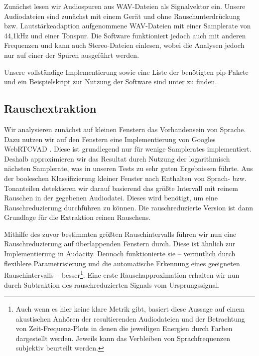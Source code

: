 \documentclass[
	fontsize=10.5pt,
	marginpar=false,
	ngerman,
	accentcolor=3d
	]{tudapub}
\begin{document}
Zunächst lesen wir Audiospuren aus WAV-Dateien als Signalvektor ein. Unsere Audiodateien sind zunächst mit einem Gerät und ohne Rauschunterdrückung bzw. Lautstärkeadaption aufgenommene WAV-Dateien mit einer Samplerate von 44,1kHz und einer Tonspur. Die Software funktioniert jedoch auch mit anderen Frequenzen und kann auch Stereo-Dateien einlesen, wobei die Analysen jedoch nur auf einer der Spuren ausgeführt werden.

Unsere vollständige Implementierung sowie eine Liste der benötigten pip-Pakete und ein Beispielskript zur Nutzung der Software sind unter \cite{blumer_polltip4fm_2020} zu finden. %

\subsection{Rauschextraktion}
\label{noiseremove}

Wir analysieren zunächst auf kleinen Fenstern das Vorhandensein von Sprache. Dazu nutzen wir auf den Fenstern eine Implementierung von Googles WebRTCVAD \cite{wiseman_webrtcvad_nodate}. Diese ist grundlegend nur für wenige Samplerates implementiert. Deshalb approximieren wir das Resultat durch Nutzung der logarithmisch nächsten Samplerate, was in unseren Tests zu sehr guten Ergebnissen führte. Aus der booleschen Klassifizierung kleiner Fenster nach Enthalten von Sprach- bzw. Tonanteilen detektieren wir darauf basierend das größte Intervall mit reinem Rauschen in der gegebenen Audiodatei. Dieses wird benötigt, um eine Rauschreduzierung durchführen zu können. Die rauschreduzierte Version ist dann Grundlage für die Extraktion reinen Rauschens.

Mithilfe des zuvor bestimmten größten Rauschintervalls führen wir nun eine Rauschreduzierung auf überlappenden Fenstern durch. Diese ist ähnlich zur Implementierung in Audacity. Dennoch funktionierte sie – vermutlich durch flexiblere Parametrisierung und die automatische Erkennung eines geeigneten Rauschintervalls – besser\footnote{Auch wenn es hier keine klare Metrik gibt, basiert diese Aussage auf einem akustischen Anhören der resultierenden Audiodateien und der Betrachtung von Zeit-Frequenz-Plots in denen die jeweiligen Energien durch Farben dargestellt werden. Jeweils kann das Verbleiben von Sprachfrequenzen subjektiv beurteilt werden.}. Eine erste Rauschapproximation erhalten wir nun durch Subtraktion des rauschreduzierten Signals vom Ursprungssignal.
\end{document}
